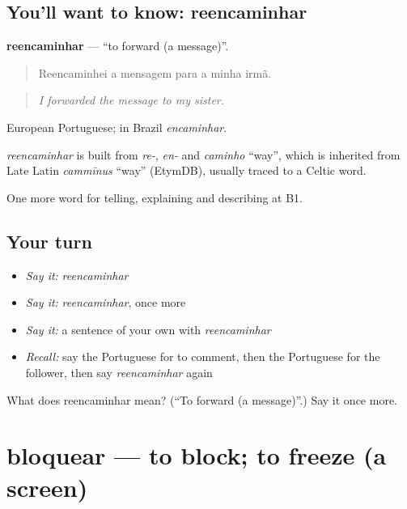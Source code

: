 \subsection*{You'll want to know: reencaminhar}
\textbf{reencaminhar} — \textquotedblleft{}to forward (a message)\textquotedblright{}.

\begin{quote}
Reencaminhei a mensagem para a minha irmã.
\end{quote}

\begin{quote}
\emph{I forwarded the message to my sister.}
\end{quote}

European Portuguese; in Brazil \emph{encaminhar}.

\begin{cousinweb}
\emph{reencaminhar} is built from \emph{re-}, \emph{en-} and \emph{caminho} \textquotedblleft{}way\textquotedblright{}, which is inherited from Late Latin \emph{cammīnus} \textquotedblleft{}way\textquotedblright{} (EtymDB), usually traced to a Celtic word.
\end{cousinweb}

\begin{grammarlens}[title={What you've built}]
One more word for telling, explaining and describing at B1.
\end{grammarlens}

\subsection*{Your turn}
\begin{itemize}
\raggedright
  \item \emph{Say it:} \emph{reencaminhar}
  \item \emph{Say it:} \emph{reencaminhar}, once more
  \item \emph{Say it:} a sentence of your own with \emph{reencaminhar}
  \item \emph{Recall:} say the Portuguese for to comment, then the Portuguese for the follower, then say \emph{reencaminhar} again
\end{itemize}

\begin{tcolorbox}[breakable,colback=teal!4,colframe=teal!35!black,title={Before you move on}]
What does reencaminhar mean? (\textquotedblleft{}To forward (a message)\textquotedblright{}.) Say it once more.
\end{tcolorbox}
\section[bloquear]{bloquear — to block; to freeze (a screen)}

